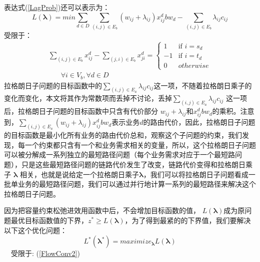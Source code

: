 表达式(\ref{LagProb})还可以表示为：
\begin{equation}\label{Lagprob1}
L(\mathbf{\lambda})= min\sum\limits_{d \in D}\sum\limits_{(i,j) \in E_b} (w_{ij}+\lambda_{ij})x_{ij}^dbw_d -\sum\limits_{(i,j) \in E_b}\lambda_{ij}c_{ij}
\end{equation}
受限于：
\begin{equation}\label{FlowConv2}
\begin{split}
\sum\limits_{(i,j) \in E_b} x_{ij}^d - \sum\limits_{(j,i) \in E_b} x_{ji}^d
=\begin{cases}
1 & \text{if $i = s_d$}\\
-1 & \text{if $i = t_d$} \\
0 &{otherwise}
\end{cases}
\\~~~~~~~~\forall i\in V_b, \forall d\in D
\end{split}
\end{equation}
拉格朗日子问题的目标函数中的$\sum_{(i,j) \in E_a}\lambda_{ij}c_{ij}$这一项，不随着拉格朗日乘子的变化而变化，本文将其作为常数项而丢掉不讨论，丢掉$\sum_{(i,j) \in E_a}\lambda_{ij}c_{ij}$ 这一项后，拉格朗日子问题的目标函数中只含有代价部分 $w_{ij}+\lambda_{ij}$和$x_{ij}^d bw_d$的乘积。注意到，$\sum_{(i,j) \in E_a} (w_{ij}+\lambda_{ij})x_{ij}^d bw_d$表示业务$d$的路由代价，因此，拉格朗日子问题的目标函数是最小化所有业务的路由代价总和，观察这个子问题的约束，我们发现，每一个约束都只含有一个和业务需求相关的变量，所以，这个拉格朗日子问题可以被分解成一系列独立的最短路径问题（每个业务需求对应于一个最短路问题），只是这些最短路径问题的链路代价发生了改变，链路代价变得和拉格朗日乘子 $\mathbf{\lambda}$ 相关，也就是说给定一个拉格朗日乘子$\mathbf{\lambda}$，我们可以将拉格朗日子问题看成一批单业务的最短路径问题，我们可以通过并行地计算一系列的最短路径来解决这个拉格朗日子问题。

因为把容量约束松弛进效用函数中后，不会增加目标函数的值， $L(\mathbf{\lambda})$成为原问题最优目标函数值的下界，$z^* \ge L(\mathbf{\lambda})$，为了得到最紧的的下界值，我们要解决以下这个优化问题：
\begin{equation}\label{dual}
L^*(\mathbf{\lambda^*}) = maximize_{\mathbf{\lambda}}L(\mathbf{\lambda})
\end{equation}
~~受限于: (\ref{FlowConv2})
\vskip 0.2cm

